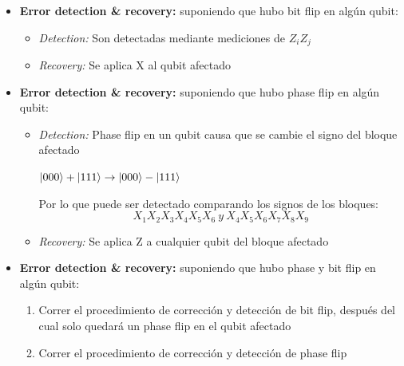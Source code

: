 \documentclass[10pt]{beamer}
\theoremstyle{remark}
\theoremstyle{definition}
\begin{document}
\begin{frame}[allowframebreaks]
    \framebreak

    \begin{itemize}
        \item \textbf{Error detection \& recovery:} suponiendo que hubo bit flip en algún qubit:
    
        \vspace{0.4cm}

        \begin{itemize}
            \item \textit{Detection:} Son detectadas mediante mediciones de $Z_iZ_j$
            \item \textit{Recovery:} Se aplica X al qubit afectado
        \end{itemize}
    \end{itemize}

    \framebreak

    \begin{itemize}
        \item \textbf{Error detection \& recovery:} suponiendo que hubo phase flip en algún qubit:
    
        \vspace{0.4cm}

        \begin{itemize}
            \item \textit{Detection:} Phase flip en un qubit causa que se cambie el signo del bloque afectado
            
            $\ket{000} + \ket{111} \rightarrow \ket{000} - \ket{111}$

            Por lo que puede ser detectado comparando los signos de los bloques:
            \[
                X_1X_2X_3X_4X_5X_6 \ y \ X_4X_5X_6X_7X_8X_9
            \]

            \item \textit{Recovery:} Se aplica Z a cualquier qubit del bloque afectado
        \end{itemize}
    \end{itemize}

    \framebreak

    \begin{itemize}
        \item \textbf{Error detection \& recovery:} suponiendo que hubo phase y bit flip en algún qubit:
    
        \vspace{0.4cm}

        \begin{enumerate}
            \item Correr el procedimiento de corrección y detección de bit flip, después del cual solo quedará un phase flip en el qubit afectado
            \item Correr el procedimiento de corrección y detección de phase flip
        \end{enumerate}
    \end{itemize}


\end{frame}
\end{document}
